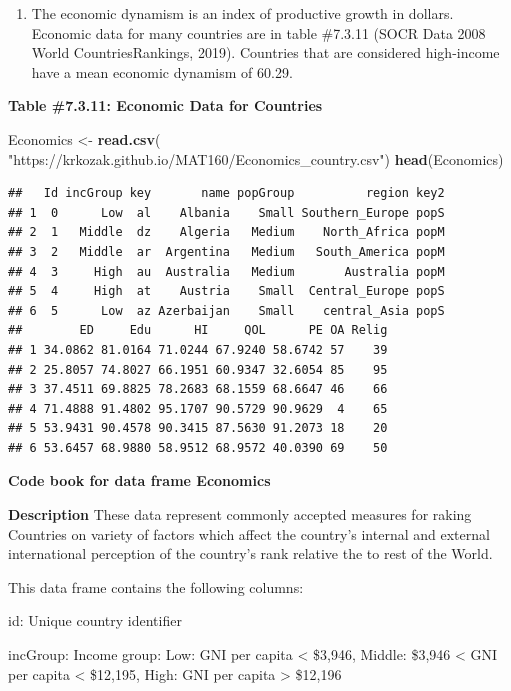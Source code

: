 \documentclass[
]{book}
\newenvironment{Shaded}{\begin{snugshade}}{\end{snugshade}}
\newcommand{\KeywordTok}[1]{\textcolor[rgb]{0.13,0.29,0.53}{\textbf{#1}}}
\newcommand{\NormalTok}[1]{#1}
\newcommand{\StringTok}[1]{\textcolor[rgb]{0.31,0.60,0.02}{#1}}
\providecommand{\tightlist}{%
  \setlength{\itemsep}{0pt}\setlength{\parskip}{0pt}}
\begin{document}
\begin{enumerate}
\def\labelenumi{\arabic{enumi}.}
\setcounter{enumi}{4}
\tightlist
\item
  The economic dynamism is an index of productive growth in dollars. Economic data for many countries are in table \#7.3.11 (SOCR Data 2008 World CountriesRankings, 2019). Countries that are considered high-income have a mean economic dynamism of 60.29.
\end{enumerate}

\textbf{Table \#7.3.11: Economic Data for Countries}

\begin{Shaded}
\begin{Highlighting}[]
\NormalTok{Economics <-}\StringTok{ }\KeywordTok{read.csv}\NormalTok{(}
  \StringTok{"https://krkozak.github.io/MAT160/Economics_country.csv"}\NormalTok{)}
\KeywordTok{head}\NormalTok{(Economics)}
\end{Highlighting}
\end{Shaded}

\begin{verbatim}
##   Id incGroup key       name popGroup          region key2
## 1  0      Low  al    Albania    Small Southern_Europe popS
## 2  1   Middle  dz    Algeria   Medium    North_Africa popM
## 3  2   Middle  ar  Argentina   Medium   South_America popM
## 4  3     High  au  Australia   Medium       Australia popM
## 5  4     High  at    Austria    Small  Central_Europe popS
## 6  5      Low  az Azerbaijan    Small    central_Asia popS
##        ED     Edu      HI     QOL      PE OA Relig
## 1 34.0862 81.0164 71.0244 67.9240 58.6742 57    39
## 2 25.8057 74.8027 66.1951 60.9347 32.6054 85    95
## 3 37.4511 69.8825 78.2683 68.1559 68.6647 46    66
## 4 71.4888 91.4802 95.1707 90.5729 90.9629  4    65
## 5 53.9431 90.4578 90.3415 87.5630 91.2073 18    20
## 6 53.6457 68.9880 58.9512 68.9572 40.0390 69    50
\end{verbatim}

\textbf{Code book for data frame Economics}

\textbf{Description}
These data represent commonly accepted measures for raking Countries on variety of factors which affect the country's internal and external international perception of the country's rank relative the to rest of the World.

This data frame contains the following columns:

id: Unique country identifier

incGroup: Income group: Low: GNI per capita \textless{} \$3,946, Middle: \$3,946 \textless{} GNI per capita \textless{} \$12,195, High: GNI per capita \textgreater{} \$12,196
\end{document}
